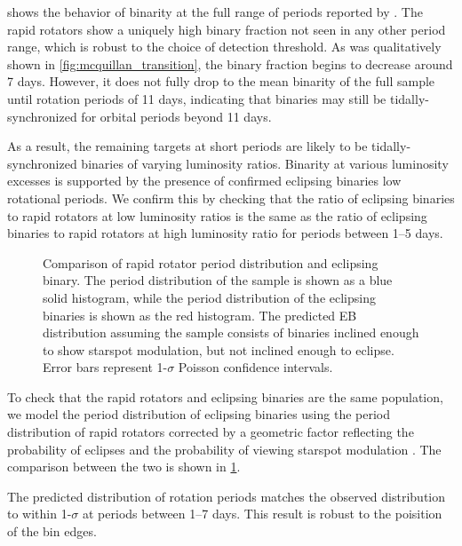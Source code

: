 \documentclass[manuscript]{aastex6}
\begin{document}
 shows the behavior of binarity at the full range of
periods reported by \citet{McQuillan14}. The rapid rotators show a uniquely
high binary fraction not seen in any other period range, which is robust to the
choice of detection threshold. As was qualitatively shown in 
\cref{fig:mcquillan_transition}, the binary fraction begins to decrease around 
7 days. However, it does not fully drop to the mean binarity of
the full sample until rotation periods of 11 days, indicating that
binaries may still be tidally-synchronized for orbital periods beyond 11 days. 

As a result, the remaining targets at short periods are likely to be
tidally-synchronized binaries of varying luminosity ratios. Binarity at various
luminosity excesses is supported by the presence of confirmed eclipsing
binaries low rotational periods. We confirm this by checking that the ratio of
eclipsing binaries to rapid rotators at low luminosity ratios is the same as
the ratio of eclipsing binaries to rapid rotators at high luminosity ratio for
periods between 1--5 days.

\begin{figure}[htb]
    \centering
    \caption{Comparison of rapid rotator period distribution and eclipsing
    binary. The period distribution of the \citep{McQuillan14} sample is shown
as a blue solid histogram, while the period distribution of the eclipsing binaries
is shown as the red histogram. The predicted EB distribution assuming the
\citep{McQuillan14} sample consists of binaries inclined enough to show
starspot modulation, but not inclined enough to eclipse. Error bars represent
1-\(\sigma\) Poisson confidence intervals.}\label{fig:eclipseprob}
\end{figure}

To check that the rapid rotators and eclipsing binaries are the same
population, we model the period distribution of eclipsing binaries using the 
period distribution of rapid rotators corrected by a geometric factor
reflecting the probability of eclipses \citep{Kirk16} and the probability of
viewing starspot modulation \citep{Jackson10,Rebull17}. The comparison between the two
is shown in \cref{fig:eclipseprob}. 

The predicted distribution of \citet{McQuillan14} rotation periods matches the 
observed distribution to within 1-\(\sigma\) at periods between 1--7 days. This
result is robust to the poisition of the bin edges.
\end{document}
